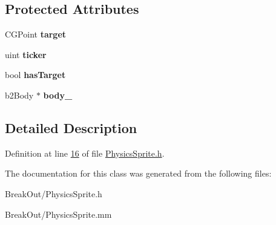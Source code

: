 \subsection*{Protected Attributes}
\begin{DoxyCompactItemize}
\item 
\hypertarget{interface_physics_sprite_aa94b7391bdfa00bc0d4c3dc8e9141513}{C\-G\-Point {\bfseries target}}\label{db/d8a/interface_physics_sprite_aa94b7391bdfa00bc0d4c3dc8e9141513}

\item 
\hypertarget{interface_physics_sprite_a038f4e8bdc36d8a71fdbdd34a85c61b7}{uint {\bfseries ticker}}\label{db/d8a/interface_physics_sprite_a038f4e8bdc36d8a71fdbdd34a85c61b7}

\item 
\hypertarget{interface_physics_sprite_ac9cf5f072dbf14242a89a44a85243023}{bool {\bfseries has\-Target}}\label{db/d8a/interface_physics_sprite_ac9cf5f072dbf14242a89a44a85243023}

\item 
\hypertarget{interface_physics_sprite_af07493ad48010e6bf4bd31389c724e9f}{b2\-Body $\ast$ {\bfseries body\-\_\-}}\label{db/d8a/interface_physics_sprite_af07493ad48010e6bf4bd31389c724e9f}

\end{DoxyCompactItemize}


\subsection{Detailed Description}


Definition at line \hyperlink{_physics_sprite_8h_source_l00016}{16} of file \hyperlink{_physics_sprite_8h_source}{Physics\-Sprite.\-h}.



The documentation for this class was generated from the following files\-:\begin{DoxyCompactItemize}
\item 
Break\-Out/Physics\-Sprite.\-h\item 
Break\-Out/Physics\-Sprite.\-mm\end{DoxyCompactItemize}

